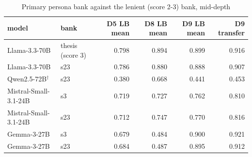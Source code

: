 \begin{table}
\caption{Primary persona bank against the lenient (score 2-3) bank, mid-depth}
\label{tab:x-bank_comparison}
\begin{tabular}{llrrrr}
\toprule
model & bank & D5 LB mean & D8 LB mean & D9 LB mean & D9 transfer \\
\midrule
Llama-3.3-70B & thesis (score 3) & 0.798 & 0.894 & 0.899 & 0.916 \\
Llama-3.3-70B & s23 & 0.786 & 0.880 & 0.888 & 0.907 \\
Qwen2.5-72B$^\dagger$ & s23 & 0.380 & 0.668 & 0.441 & 0.453 \\
Mistral-Small-3.1-24B & s3 & 0.719 & 0.727 & 0.762 & 0.810 \\
Mistral-Small-3.1-24B & s23 & 0.712 & 0.747 & 0.770 & 0.816 \\
Gemma-3-27B & s3 & 0.679 & 0.484 & 0.900 & 0.921 \\
Gemma-3-27B & s23 & 0.684 & 0.487 & 0.895 & 0.912 \\
\bottomrule
\end{tabular}
\end{table}
